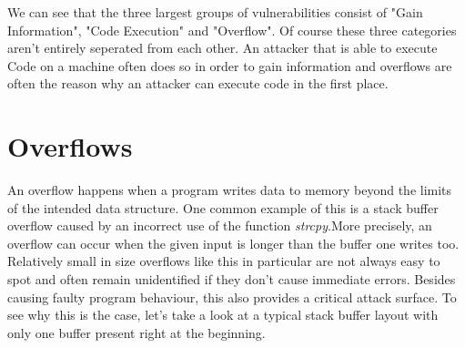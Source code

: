 \documentclass[10pt,twocolumn,a4paper]{article}
\begin{document}
We can see that the three largest groups of vulnerabilities consist of "Gain Information", "Code Execution" and "Overflow".
Of course these three categories aren't entirely seperated from each other.
An attacker that is able to execute Code on a machine often does so in order to gain information and overflows are often the reason why an attacker can execute code in the first place.
\section{Overflows}\label{sec:Overflows}
An overflow happens when a program writes data to memory beyond the limits of the intended data structure.
One common example of this is a stack buffer overflow caused by an incorrect use of the function \emph{strcpy}.More precisely, an overflow can occur when the given input is longer than the buffer one writes too.
Relatively small in size overflows like this in particular are not always easy to spot and often remain unidentified if they don't cause immediate errors.
Besides causing faulty program behaviour, this also provides a critical attack surface.
To see why this is the case, let's take a look at a typical stack buffer layout with only one buffer present right at the beginning.
\end{document}
